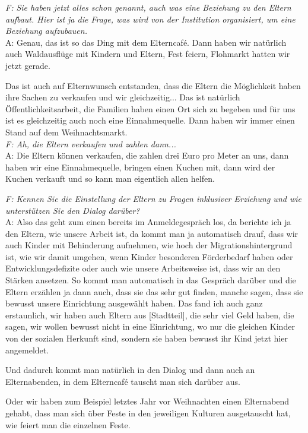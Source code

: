 \begin{linenumbers*}
\emph{F:  Sie haben jetzt alles schon genannt, auch was eine Beziehung zu den Eltern aufbaut.  
Hier ist ja die Frage, was wird von der Institution organisiert, um eine Beziehung aufzubauen.}\\
A:  Genau, das ist so das Ding mit dem Elterncafé. Dann haben wir natürlich auch Waldausflüge mit Kindern und Eltern, Fest feiern, Flohmarkt hatten wir jetzt gerade.  

Das ist auch auf Elternwunsch entstanden, dass die Eltern die Möglichkeit haben ihre Sachen zu verkaufen und wir gleichzeitig... Das ist natürlich Öffentlichkeitsarbeit, die Familien haben einen Ort sich zu begeben und für uns ist es gleichzeitig auch noch eine Einnahmequelle. Dann haben wir immer einen Stand auf dem Weihnachtsmarkt.\\
\emph{F: Ah, die Eltern verkaufen und zahlen dann...}\\
A:  Die Eltern können verkaufen, die zahlen drei Euro pro Meter an uns, dann haben wir eine Einnahmequelle, bringen einen Kuchen mit, dann wird der Kuchen verkauft und so kann man eigentlich allen helfen.  

\emph{F: Kennen Sie die Einstellung der Eltern zu Fragen inklusiver Erziehung und wie unterstützen Sie den Dialog darüber?}\\
A: Also das geht zum einen bereits im Anmeldegespräch los, da berichte ich ja den Eltern, wie unsere Arbeit ist, da kommt man ja automatisch drauf, dass wir auch Kinder mit Behinderung aufnehmen, wie hoch der Migrationshintergrund ist, wie wir damit umgehen, wenn Kinder besonderen Förderbedarf haben oder Entwicklungsdefizite oder auch wie unsere Arbeitsweise ist, dass wir an den Stärken ansetzen. So kommt man automatisch in das Gespräch darüber und die Eltern erzählen ja dann auch, dass sie das sehr gut finden, 
manche sagen, dass sie bewusst unsere Einrichtung ausgewählt haben. 
Das fand ich auch ganz erstaunlich, wir haben auch Eltern aus {[Stadtteil]}, die sehr viel Geld haben, die sagen, wir wollen bewusst nicht in eine Einrichtung, wo nur die gleichen Kinder von der sozialen Herkunft sind, sondern sie haben bewusst ihr Kind jetzt hier angemeldet.  

Und dadurch kommt man natürlich in den Dialog und dann auch an Elternabenden, in dem Elterncafé tauscht man sich darüber aus. 

Oder wir haben zum Beispiel letztes Jahr vor Weihnachten einen Elternabend gehabt, dass man sich über Feste in den jeweiligen Kulturen ausgetauscht hat, wie feiert man die einzelnen Feste.  


\end{linenumbers*}
